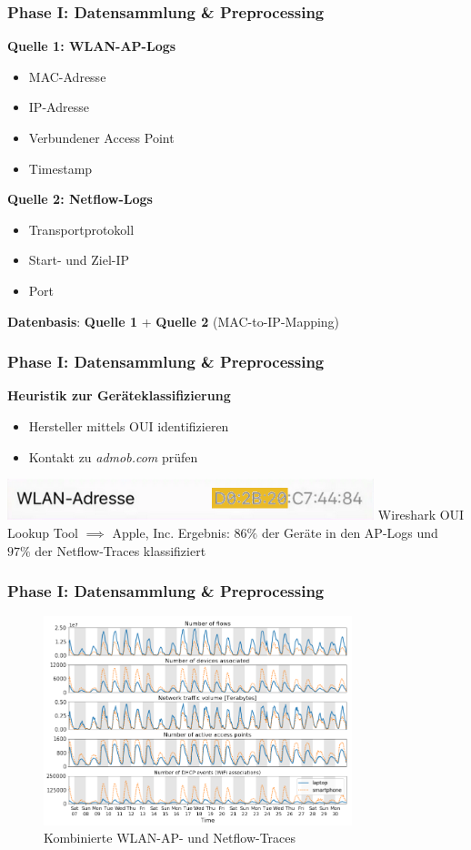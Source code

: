 \documentclass{beamer}
\begin{document}
\begin{frame}
  \frametitle{Phase I: Datensammlung \& Preprocessing}
  \textbf{Quelle 1: WLAN-AP-Logs}
  \begin{itemize}
    \item MAC-Adresse
    \item IP-Adresse
    \item Verbundener Access Point
    \item Timestamp
  \end{itemize}
  \textbf{Quelle 2: Netflow-Logs}
  \begin{itemize}
    \item Transportprotokoll
    \item Start- und Ziel-IP
    \item Port
  \end{itemize}
  \textbf{Datenbasis}: \textbf{Quelle 1} + \textbf{Quelle 2} (MAC-to-IP-Mapping)
\end{frame}

\begin{frame}
  \frametitle{Phase I: Datensammlung \& Preprocessing}
  \textbf{Heuristik zur Geräteklassifizierung}
  \begin{itemize}
    \item Hersteller mittels OUI identifizieren
    \item Kontakt zu \textit{admob.com} prüfen
  \end{itemize}
  \includegraphics[width=0.8\textwidth]{images/MAC_iPhone.png}\newline
  Wireshark OUI Lookup Tool $\implies$ Apple, Inc.\newline\newline
  Ergebnis: $86\%$ der Geräte in den AP-Logs und $97\%$ der Netflow-Traces klassifiziert
\end{frame}

\begin{frame}
  \frametitle{Phase I: Datensammlung \& Preprocessing}
  \begin{figure}
    \centering
    \includegraphics[width=0.8\textwidth]{images/traces.png}
    \caption*{Kombinierte WLAN-AP- und Netflow-Traces}
  \end{figure}  
\end{frame}
\end{document}
